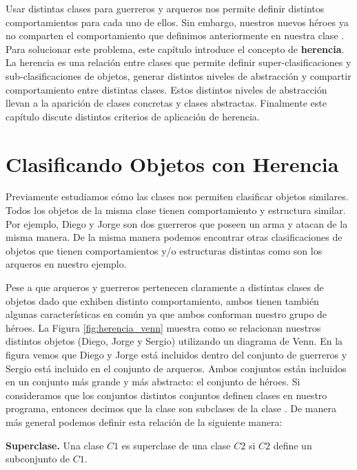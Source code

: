 \documentclass[a4paper,12pt]{book}
\begin{document}
Usar distintas clases para guerreros y arqueros nos permite definir distintos comportamientos para cada uno de ellos. Sin embargo, nuestros nuevos héroes ya no comparten el comportamiento que definimos anteriormente en nuestra clase . Para solucionar este problema, este capítulo introduce el concepto de \textbf{herencia}. La herencia es una relación entre clases que permite definir super-clasificaciones y sub-clasificaciones de objetos, generar distintos niveles de abstracción y compartir comportamiento entre distintas clases. Estos distintos niveles de abstracción llevan a la aparición de clases concretas y clases abstractas. Finalmente este capítulo discute distintos criterios de aplicación de herencia.

\section{Clasificando Objetos con Herencia}

Previamente estudiamos cómo las clases nos permiten clasificar objetos similares. Todos los objetos de la misma clase tienen comportamiento y estructura similar. Por ejemplo, Diego y Jorge son dos guerreros que poseen un arma y atacan de la misma manera. De la misma manera podemos encontrar otras clasificaciones de objetos que tienen comportamientos y/o estructuras distintas como son los arqueros en nuestro ejemplo.

Pese a que arqueros y guerreros pertenecen claramente a distintas clases de objetos dado que exhiben distinto comportamiento, ambos tienen también algunas características en común ya que ambos conforman nuestro grupo de héroes. La Figura \ref{fig:herencia_venn} muestra como se relacionan nuestros distintos objetos (Diego, Jorge y Sergio) utilizando un diagrama de Venn. En la figura vemos que Diego y Jorge está incluidos dentro del conjunto de guerreros y Sergio está incluido en el conjunto de arqueros. Ambos conjuntos están incluidos en un conjunto más grande y más abstracto: el conjunto de héroes. Si consideramos que los conjuntos distintos conjuntos definen clases en nuestro programa, entonces decimos que la clase  son subclases de la clase . De manera más general podemos definir esta relación de la siguiente manera:

\begin{definition}\textbf{Superclase.} 
Una clase $C1$ es superclase de una clase $C2$ si $C2$ define un subconjunto de $C1$.
\end{definition}
\end{document}
